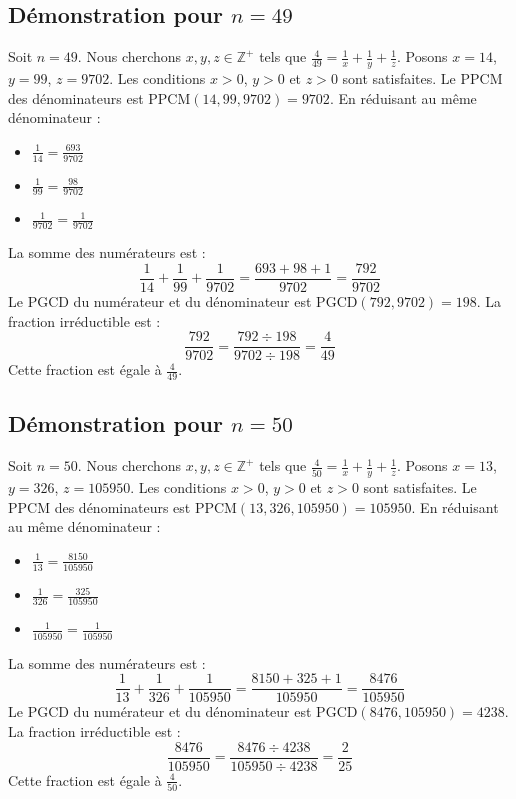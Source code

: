 \documentclass[11pt,a4paper]{article}
\begin{document}
\subsection{Démonstration pour $n = 49$}
Soit $n = 49$. Nous cherchons $x, y, z \in \mathbb{Z}^{+}$ tels que $\frac{4}{49} = \frac{1}{x} + \frac{1}{y} + \frac{1}{z}$.
Posons $x = 14$, $y = 99$, $z = 9702$.
Les conditions $x > 0$, $y > 0$ et $z > 0$ sont satisfaites.
Le PPCM des dénominateurs est $\text{PPCM}(14, 99, 9702) = 9702$.
En réduisant au même dénominateur :
\begin{itemize}
    \item $\frac{1}{14} = \frac{693}{9702}$
    \item $\frac{1}{99} = \frac{98}{9702}$
    \item $\frac{1}{9702} = \frac{1}{9702}$
\end{itemize}
La somme des numérateurs est :
$$ \frac{1}{14} + \frac{1}{99} + \frac{1}{9702} = \frac{693 + 98 + 1}{9702} = \frac{792}{9702} $$
Le PGCD du numérateur et du dénominateur est $\text{PGCD}(792, 9702) = 198$.
La fraction irréductible est :
$$ \frac{792}{9702} = \frac{792 \div 198}{9702 \div 198} = \frac{4}{49} $$
Cette fraction est égale à $\frac{4}{49}$.

\subsection{Démonstration pour $n = 50$}
Soit $n = 50$. Nous cherchons $x, y, z \in \mathbb{Z}^{+}$ tels que $\frac{4}{50} = \frac{1}{x} + \frac{1}{y} + \frac{1}{z}$.
Posons $x = 13$, $y = 326$, $z = 105950$.
Les conditions $x > 0$, $y > 0$ et $z > 0$ sont satisfaites.
Le PPCM des dénominateurs est $\text{PPCM}(13, 326, 105950) = 105950$.
En réduisant au même dénominateur :
\begin{itemize}
    \item $\frac{1}{13} = \frac{8150}{105950}$
    \item $\frac{1}{326} = \frac{325}{105950}$
    \item $\frac{1}{105950} = \frac{1}{105950}$
\end{itemize}
La somme des numérateurs est :
$$ \frac{1}{13} + \frac{1}{326} + \frac{1}{105950} = \frac{8150 + 325 + 1}{105950} = \frac{8476}{105950} $$
Le PGCD du numérateur et du dénominateur est $\text{PGCD}(8476, 105950) = 4238$.
La fraction irréductible est :
$$ \frac{8476}{105950} = \frac{8476 \div 4238}{105950 \div 4238} = \frac{2}{25} $$
Cette fraction est égale à $\frac{4}{50}$.
\end{document}
